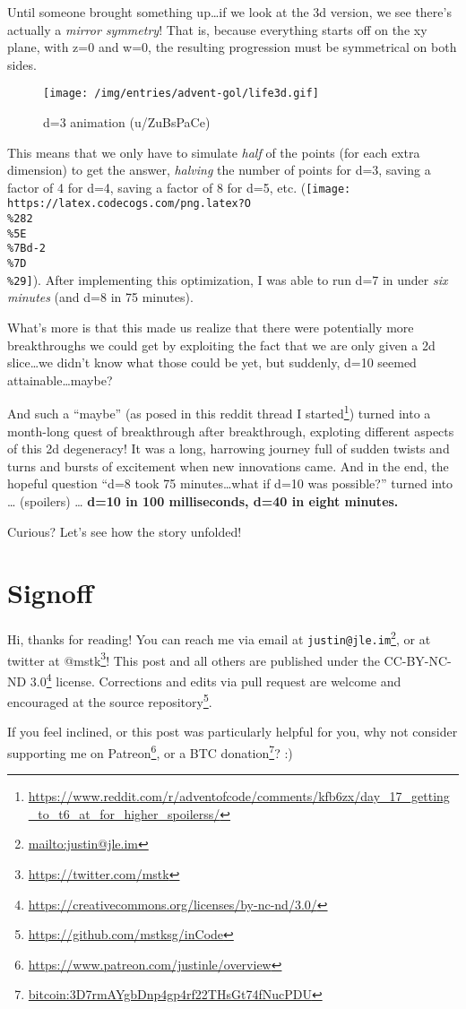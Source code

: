 \documentclass[]{article}
\renewcommand{\href}[2]{#2\footnote{\url{#1}}}
\begin{document}
Until someone brought something up\ldots if we look at the 3d version, we see
there's actually a \emph{mirror symmetry}! That is, because everything starts
off on the xy plane, with z=0 and w=0, the resulting progression must be
symmetrical on both sides.

\begin{figure}
\centering
\texttt{[image: /img/entries/advent-gol/life3d.gif]}
\caption{d=3 animation (u/ZuBsPaCe)}
\end{figure}

This means that we only have to simulate \emph{half} of the points (for each
extra dimension) to get the answer, \emph{halving} the number of points for d=3,
saving a factor of 4 for d=4, saving a factor of 8 for d=5, etc.
(\texttt{[image: https://latex.codecogs.com/png.latex?O\\\%282\\\%5E\\\%7Bd-2\\\%7D\\\%29]}).
After implementing this optimization, I was able to run d=7 in under \emph{six
minutes} (and d=8 in 75 minutes).

What's more is that this made us realize that there were potentially more
breakthroughs we could get by exploiting the fact that we are only given a 2d
slice\ldots we didn't know what those could be yet, but suddenly, d=10 seemed
attainable\ldots maybe?

And such a ``maybe'' (as posed in
\href{https://www.reddit.com/r/adventofcode/comments/kfb6zx/day_17_getting_to_t6_at_for_higher_spoilerss/}{this
reddit thread I started}) turned into a month-long quest of breakthrough after
breakthrough, exploting different aspects of this 2d degeneracy! It was a long,
harrowing journey full of sudden twists and turns and bursts of excitement when
new innovations came. And in the end, the hopeful question ``d=8 took 75
minutes\ldots what if d=10 was possible?'' turned into \ldots{} (spoilers)
\ldots{} \textbf{d=10 in 100 milliseconds, d=40 in eight minutes.}

Curious? Let's see how the story unfolded!

\hypertarget{signoff}{%
\section{Signoff}\label{signoff}}

Hi, thanks for reading! You can reach me via email at
\href{mailto:justin@jle.im}{\nolinkurl{justin@jle.im}}, or at twitter at
\href{https://twitter.com/mstk}{@mstk}! This post and all others are published
under the \href{https://creativecommons.org/licenses/by-nc-nd/3.0/}{CC-BY-NC-ND
3.0} license. Corrections and edits via pull request are welcome and encouraged
at \href{https://github.com/mstksg/inCode}{the source repository}.

If you feel inclined, or this post was particularly helpful for you, why not
consider \href{https://www.patreon.com/justinle/overview}{supporting me on
Patreon}, or a \href{bitcoin:3D7rmAYgbDnp4gp4rf22THsGt74fNucPDU}{BTC donation}?
:)
\end{document}
